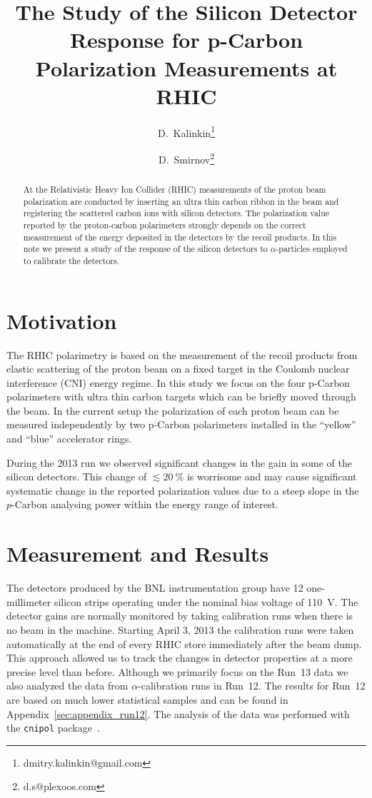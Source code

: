 \documentclass[a4paper,12pt]{article}
\title{The Study of the Silicon Detector Response for p-Carbon Polarization Measurements at RHIC}
\author[1]{D.~Kalinkin\thanks{dmitry.kalinkin@gmail.com}}
\author[2]{D.~Smirnov\thanks{d.s@plexoos.com}}
\affil[1]{Institute for Theoretical and Experimental Physics}
\affil[2]{Brookhaven National Laboratory}
\begin{document}
\maketitle

\begin{abstract}

At the Relativistic Heavy Ion Collider (RHIC) measurements of the proton beam
polarization are conducted by inserting an ultra thin carbon ribbon in the beam
and registering the scattered carbon ions with silicon detectors. The
polarization value reported by the proton-carbon polarimeters strongly depends
on the correct measurement of the energy deposited in the detectors by the
recoil products. In this note we present a study of the response of the silicon
detectors to $\alpha$-particles employed to calibrate the detectors.

\end{abstract}


\section{Motivation}

The RHIC polarimetry is based on the measurement of the recoil products from
elastic scattering of the proton beam on a fixed target in the Coulomb nuclear
interference (CNI) energy regime. In this study we focus on the four p-Carbon
polarimeters with ultra thin carbon targets which can be briefly moved through
the beam. In the current setup the polarization of each proton beam can be
measured independently by two p-Carbon polarimeters installed in the ``yellow''
and ``blue'' accelerator rings.

During the 2013 run we observed significant changes in the gain in some of the
silicon detectors. This change of $\lesssim 20~\%$ is worrisome and may cause
significant systematic change in the reported polarization values due to a steep
slope in the $p$-Carbon analysing power within the energy range of interest.


\section{Measurement and Results}

The detectors produced by the BNL instrumentation group have 12 one-millimeter
silicon strips operating under the nominal bias voltage of 110~V. The detector
gains are normally monitored by taking calibration runs when there is no beam in
the machine. Starting April 3, 2013 the calibration runs were taken
automatically at the end of every RHIC store immediately after the beam dump.
This approach allowed us to track the changes in detector properties at a more
precise level than before. Although we primarily focus on the Run~13 data we
also analyzed the data from $\alpha$-calibration runs in Run~12. The results for
Run~12 are based on much lower statistical samples and can be found in
Appendix~\ref{sec:appendix_run12}. The analysis of the data was performed with
the {\tt cnipol} package~\cite{cnipol_code}.
\end{document}
